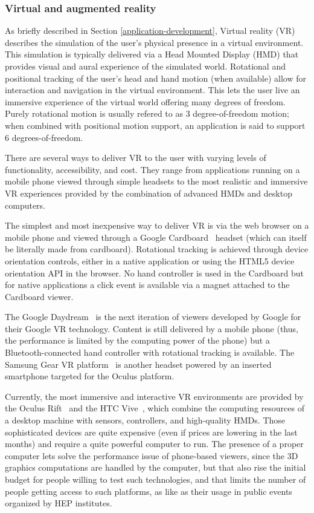 \documentclass[12pt,a4paper]{article}
\begin{document}
\hypertarget{vr}{%
\subsubsection{Virtual and augmented reality}\label{vr}}

As briefly described in Section \ref{application-development}, Virtual reality (VR) describes the simulation of the user’s
physical presence in a virtual environment. This simulation
is typically delivered via a Head Mounted Display (HMD) that provides visual and aural experience of the simulated world.
Rotational and positional tracking of the user’s head and hand motion (when available) allow for interaction and navigation
in the virtual environment. This lets the user live an immersive experience of the virtual world offering many degrees of freedom. Purely rotational motion is usually refered to as
3 degree-of-freedom motion; when combined with positional motion support, an application is said to support 6 degrees-of-freedom.

There are several ways to deliver VR to the user with varying levels of functionality, accessibility, and cost.
They range from applications running on a mobile phone viewed through simple headsets to the most realistic and
immersive VR experiences provided by the combination of advanced HMDs and desktop computers.

The simplest and most inexpensive way to deliver VR is via the web browser on a mobile phone and viewed through a
Google Cardboard~\cite{GoogleCardboard} headset (which can itself be literally made from cardboard).
Rotational tracking is achieved through device orientation
controls, either in a native application or using the HTML5 device orientation API in the browser. No hand controller is
used in the Cardboard but for native applications a click event is available via a magnet attached to the Cardboard viewer.

The Google Daydream~\cite{GoogleDaydream} is the next iteration of viewers developed by Google for their Google VR technology.
Content is still delivered by a mobile phone (thus, the performance is limited by the computing power of the phone) but a
Bluetooth-connected hand controller with rotational tracking is available. The Samsung Gear VR platform~\cite{SamsungGearVR}
is another headset powered by an inserted smartphone targeted for the Oculus platform.

Currently, the most immersive and interactive VR environments are provided by the Oculus Rift~\cite{OculusRift} and the
HTC Vive~\cite{HTCVive}, which combine the computing resources of a desktop machine with sensors, controllers, and high-quality HMDs.
Those sophisticated devices are quite expensive (even if prices are lowering in the last months) and require a quite powerful computer to run.
The presence of a proper computer lets solve the performance issue of phone-based viewers, since the 3D graphics computations are handled
by the computer, but that also rise the initial budget for people willing to test such technologies, and that limits the number of
people getting access to such platforms, as like as their usage in public events organized by HEP institutes.
\end{document}
